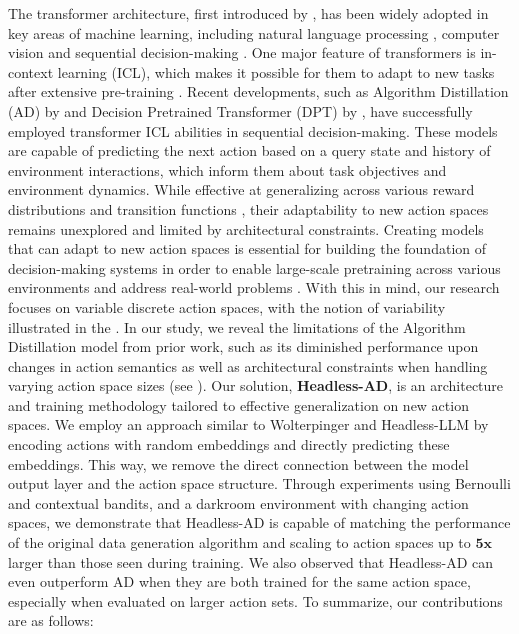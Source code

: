 \documentclass{article}
\theoremstyle{plain}
\theoremstyle{definition}
\theoremstyle{remark}
\begin{document}
The transformer architecture, first introduced by \citet{vaswani2017attention}, has been widely adopted in key areas of machine learning, including natural language processing \citep{radford2018improving, devlin2018bert}, computer vision \citep{dosovitskiy2020image} and sequential decision-making \citep{chen2021decision}. One major feature of transformers is in-context learning (ICL), which makes it possible for them to adapt to new tasks after extensive pre-training \citep{brown2020language, liu2023pre}. Recent developments, such as Algorithm Distillation (AD) by \citet{laskin2022context} and Decision Pretrained Transformer (DPT) by \citet{lee2023supervised}, have successfully employed transformer ICL abilities in sequential decision-making. These models are capable of predicting the next action based on a query state and history of environment interactions, which inform them about task objectives and environment dynamics. While effective at generalizing across various reward distributions \citep{laskin2022context, lee2023supervised} and transition functions \citep{raparthy2023generalization}, their adaptability to new action spaces remains unexplored and limited by architectural constraints.
Creating models that can adapt to new action spaces is essential for building the foundation of decision-making systems in order to enable large-scale pretraining across various environments and address real-world problems \citep{jain2020generalization, chandak2020lifelong, london2020offline, jain2021know}. With this in mind, our research focuses on variable discrete action spaces, with the notion of variability illustrated in the . In our study, we reveal the limitations of the Algorithm Distillation model from prior work, such as its diminished performance upon changes in action semantics as well as architectural constraints when handling varying action space sizes (see ).
Our solution, \textbf{Headless-AD}, is an architecture and training methodology tailored to effective generalization on new action spaces. We employ an approach similar to Wolterpinger \citep{dulac2015deep} and Headless-LLM \citep{godey2023headless} by encoding actions with random embeddings \citep{kirsch2023towards} and directly predicting these embeddings. This way, we remove the direct connection between the model output layer and the action space structure.
Through experiments using Bernoulli and contextual bandits, and a darkroom environment with changing action spaces, we demonstrate that Headless-AD is capable of matching the performance of the original data generation algorithm and scaling to action spaces up to $\textbf{5x}$ larger than those seen during training. We also observed that Headless-AD can even outperform AD when they are both trained for the same action space, especially when evaluated on larger action sets. To summarize, our contributions are as follows:
\end{document}
